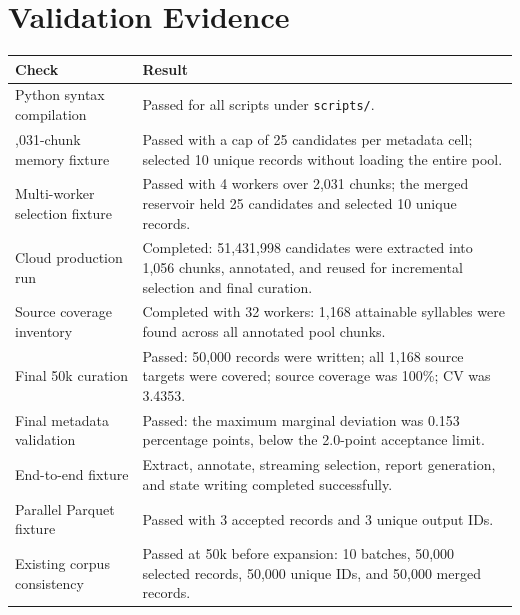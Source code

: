 \documentclass[11pt,a4paper]{article}
\begin{document}
\section{Validation Evidence}
\begin{longtable}{>{\raggedright\arraybackslash}p{}>{\raggedright\arraybackslash}p{}}
\toprule
\textbf{Check} & \textbf{Result} \\
\midrule
Python syntax compilation & Passed for all scripts under \texttt{scripts/}. \\
2,031-chunk memory fixture & Passed with a cap of 25 candidates per metadata cell; selected 10 unique records without loading the entire pool. \\
Multi-worker selection fixture & Passed with 4 workers over 2,031 chunks; the merged reservoir held 25 candidates and selected 10 unique records. \\
Cloud production run & Completed: 51,431,998 candidates were extracted into 1,056 chunks, annotated, and reused for incremental selection and final curation. \\
Source coverage inventory & Completed with 32 workers: 1,168 attainable syllables were found across all annotated pool chunks. \\
Final 50k curation & Passed: 50,000 records were written; all 1,168 source targets were covered; source coverage was 100\%; CV was 3.4353. \\
Final metadata validation & Passed: the maximum marginal deviation was 0.153 percentage points, below the 2.0-point acceptance limit. \\
End-to-end fixture & Extract, annotate, streaming selection, report generation, and state writing completed successfully. \\
Parallel Parquet fixture & Passed with 3 accepted records and 3 unique output IDs. \\
Existing corpus consistency & Passed at 50k before expansion: 10 batches, 50,000 selected records, 50,000 unique IDs, and 50,000 merged records. \\
\bottomrule
\end{longtable}
\end{document}
